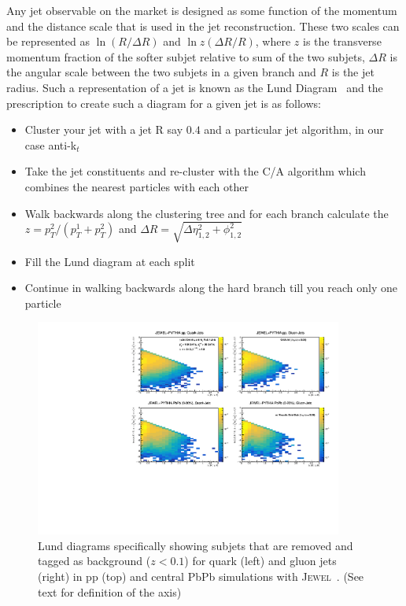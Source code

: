 \documentclass[notoc]{JHEP3}
\newcommand{\jw}{\textsc{Jewel}~}
\begin{document}
Any jet observable on the market is designed as some function of the momentum and the distance scale that is used in the jet reconstruction. These two scales can be represented as $\ln (R/\Delta R)$ and $\ln z(\Delta R/R)$, where $z$ is the transverse momentum fraction of the softer subjet relative to sum of the two subjets, $\Delta R$ is the angular scale between the two subjets in a given branch and $R$ is the jet radius. Such a representation of a jet is known as the Lund Diagram~\cite{Salam:2016yht} and the prescription to create such a diagram for a given jet is as follows:
\begin{itemize}
	\item Cluster your jet with a jet R say $0.4$ and a particular jet algorithm, in our case anti-k$_{t}$
	\item Take the jet constituents and re-cluster with the C/A algorithm which combines the nearest particles with each other
	\item Walk backwards along the clustering tree and for each branch calculate the $z=p^{2}_{T}/(p^{1}_{T}+p^{2}_{T})$ and $\Delta R = \sqrt{\Delta \eta^2_{1, 2}+\phi^2_{1, 2}}$
	\item Fill the Lund diagram at each split
	\item Continue in walking backwards along the hard branch till you reach only one particle
\end{itemize}

\begin{figure}[t]
	\centering
	\includegraphics[width=0.9\textwidth]{plots/Individual_LundDiagrams_zrel_background.pdf}
	\caption{Lund diagrams specifically showing subjets that are removed and tagged as background ($z<0.1$) for quark (left) and gluon jets (right) in pp (top) and central PbPb simulations with \jw. (See text for definition of the axis)}
\label{fig:Lund_bkg}
\end{figure}
\end{document}
